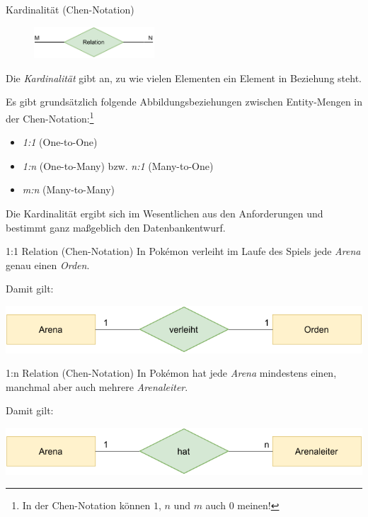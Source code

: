 \begin{defi}{Kardinalität (Chen-Notation)}
    \begin{figure}
        \begin{center}
            \includegraphics[width=0.4\textwidth]{includes/figures/definition_entity_relationship_model_cardinality.pdf}
        \end{center}
    \end{figure}
    Die \emph{Kardinalität} gibt an, zu wie vielen Elementen ein Element in Beziehung steht.

    Es gibt grundsätzlich folgende Abbildungsbeziehungen zwischen Entity-Mengen in der Chen-Notation:\footnote{In der Chen-Notation können $1$, $n$ und $m$ auch $0$ meinen!}
    \begin{itemize}
        \item \emph{1:1} (One-to-One)
        \item \emph{1:n} (One-to-Many) bzw. \emph{n:1} (Many-to-One)
        \item \emph{m:n} (Many-to-Many)
    \end{itemize}

    Die Kardinalität ergibt sich im Wesentlichen aus den Anforderungen und bestimmt ganz maßgeblich den Datenbankentwurf.
\end{defi}

\newpage

\begin{example}{1:1 Relation (Chen-Notation)}
    In Pokémon verleiht im Laufe des Spiels jede \emph{Arena} genau einen \emph{Orden}.

    Damit gilt:
    \begin{center}
        \includegraphics[width=0.7\linewidth]{includes/figures/example_entity_relationship_modell_chen_one_to_one.pdf}
    \end{center}
\end{example}

\begin{example}{1:n Relation (Chen-Notation)}
    In Pokémon hat jede \emph{Arena} mindestens einen, manchmal aber auch mehrere \emph{Arenaleiter}.

    Damit gilt:
    \begin{center}
        \includegraphics[width=0.7\linewidth]{includes/figures/example_entity_relationship_modell_chen_one_to_many.pdf}
    \end{center}
\end{example}

